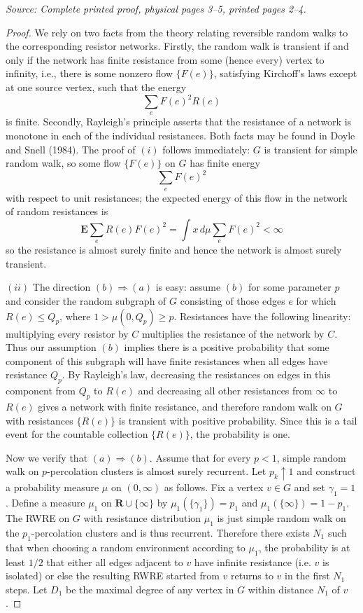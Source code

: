\documentclass[11pt]{article}
\newcommand{\EE}{\mathbf E}
\newcommand{\src}[1]{\par\smallskip\noindent\textit{Source: #1.}\par\nopagebreak[4]\smallskip}
\begin{document}
\src{Complete printed proof, physical pages 3--5, printed pages 2--4}
\begin{proof}
We rely on two facts from the theory relating reversible random walks to
the corresponding resistor networks. Firstly, the random walk is transient
if and only if the network has finite resistance from some (hence every)
vertex to infinity, i.e., there is some nonzero flow $\{F(e)\}$, satisfying
Kirchoff's laws except at one source vertex, such that the energy
\[
\sum_e F(e)^2R(e)
\]
is finite. Secondly, Rayleigh's principle asserts that the resistance of a
network is monotone in each of the individual resistances. Both facts may
be found in Doyle and Snell (1984). The proof of $(i)$ follows immediately:
$G$ is transient for simple random walk, so some flow $\{F(e)\}$ on $G$ has
finite energy
\[
\sum_e F(e)^2
\]
with respect to unit resistances; the expected energy of this flow in the
network of random resistances is
\[
\EE\sum_e R(e)F(e)^2=\int x\,d\mu\sum_e F(e)^2<\infty
\]
so the resistance is almost surely finite and hence the network is almost surely transient.

$(ii)$ The direction $(b)\Rightarrow(a)$ is easy: assume $(b)$ for some
parameter $p$ and consider the random subgraph of $G$ consisting of those
edges $e$ for which $R(e)\leq Q_p$, where $1>\mu(0,Q_p)\geq p$.
Resistances have the following linearity: multiplying every resistor by $C$
multiplies the resistance of the network by $C$. Thus our assumption $(b)$
implies there is a positive probability that some component of this
subgraph will have finite resistances when all edges have resistance $Q_p$.
By Rayleigh's law, decreasing the resistances on edges in this component
from $Q_p$ to $R(e)$ and decreasing all other resistances from $\infty$ to
$R(e)$ gives a network with finite resistance, and therefore random walk on
$G$ with resistances $\{R(e)\}$ is transient with positive probability.
Since this is a tail event for the countable collection $\{R(e)\}$, the
probability is one.

Now we verify that $(a)\Rightarrow(b)$. Assume that for every $p<1$,
simple random walk on $p$-percolation clusters is almost surely recurrent.
Let $p_k\uparrow1$ and construct a probability measure $\mu$ on
$(0,\infty)$ as follows. Fix a vertex $v\in G$ and set $\gamma_1=1$.
Define a measure $\mu_1$ on $\mathbf R\cup\{\infty\}$ by
$\mu_1(\{\gamma_1\})=p_1$ and $\mu_1(\{\infty\})=1-p_1$.
The RWRE on $G$ with resistance distribution $\mu_1$ is just simple random
walk on the $p_1$-percolation clusters and is thus recurrent. Therefore
there exists $N_1$ such that when choosing a random environment according
to $\mu_1$, the probability is at least $1/2$ that either all edges
adjacent to $v$ have infinite resistance (i.e. $v$ is isolated) or else the
resulting RWRE started from $v$ returns to $v$ in the first $N_1$ steps.
Let $D_1$ be the maximal degree of any vertex in $G$ within distance $N_1$ of $v$.


\end{proof}
\end{document}
